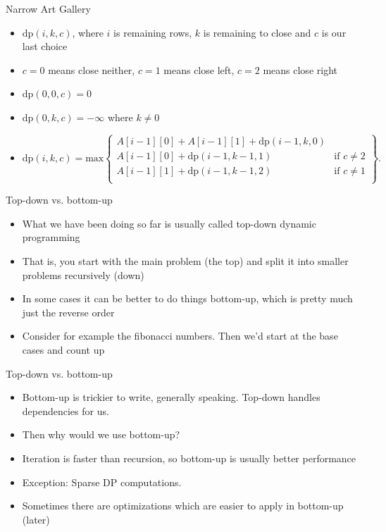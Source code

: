 \documentclass{beamer}
\begin{document}
\begin{frame}[plain]{Narrow Art Gallery}
    \begin{itemize}
        \item<1-> $\mathrm{dp}(i, k, c)$, where $i$ is remaining rows, $k$ is remaining to close and $c$ is our last choice
        \item<1-> $c = 0$ means close neither, $c = 1$ means close left, $c = 2$ means close right
        \item<2-> $\mathrm{dp}(0, 0, c) = 0$
        \item<2-> $\mathrm{dp}(0, k, c) = -\infty$ where $k \neq 0$
        \item<3-> $\mathrm{dp}(i, k, c) = \mathrm{max} \left\{
	\begin{array}{ll}
        A[i-1][0] + A[i-1][1] + \mathrm{dp}(i - 1, k, 0) & \\
        A[i-1][0] + \mathrm{dp}(i - 1, k - 1, 1) & \textrm{if } c \neq 2 \\
        A[i-1][1] + \mathrm{dp}(i - 1, k - 1, 2) & \textrm{if } c \neq 1 \\
	\end{array}
            \right\}.$
    \end{itemize}
\end{frame}

\begin{frame}[plain]{Top-down vs. bottom-up}
    \begin{itemize}
        \item What we have been doing so far is usually called top-down dynamic programming
        \item That is, you start with the main problem (the top) and split it into smaller problems recursively (down)
        \item In some cases it can be better to do things bottom-up, which is pretty much just the reverse order
        \item Consider for example the fibonacci numbers. Then we'd start at the base cases and count up
    \end{itemize}
\end{frame}

\begin{frame}[plain]{Top-down vs. bottom-up}
    \begin{itemize}
        \item Bottom-up is trickier to write, generally speaking. Top-down handles dependencies for us.
        \item Then why would we use bottom-up?
        \item Iteration is faster than recursion, so bottom-up is usually better performance
        \item Exception: Sparse DP computations.
        \item Sometimes there are optimizations which are easier to apply in bottom-up (later)
    \end{itemize}
\end{frame}
\end{document}
